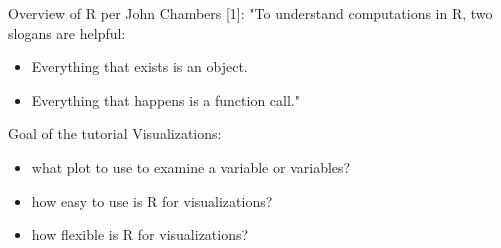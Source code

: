 \begin{frame}
	\begin{center}
  		\begin{block}{Overview of R per John Chambers [1]:} 
			"To understand computations in R, two slogans are helpful:
			\begin{itemize}
			        \item Everything that exists is an object.
			        \item Everything that happens is a function call."
			\end{itemize}
		\end{block}
	\end{center} 

\end{frame}

\begin{frame}
	\begin{center}
  		\begin{block}{Goal of the tutorial} 
Visualizations:
	\begin{itemize}
		\item what plot to use to examine a variable or variables?
		\item how easy to use is R for visualizations?
		\item how flexible is R for visualizations?
	\end{itemize}		
		\end{block}
	\end{center} 
\end{frame}







